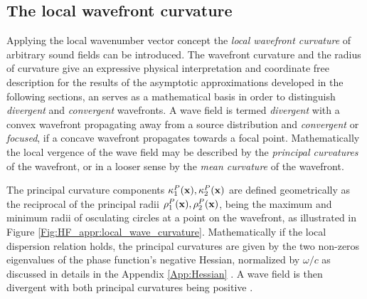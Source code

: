 \subsection{The local wavefront curvature}
%
Applying the local wavenumber vector concept the \emph{local wavefront curvature} of arbitrary sound fields can be introduced.
The wavefront curvature and the radius of curvature give an expressive physical interpretation and coordinate free description for the results of the asymptotic approximations developed in the following sections, an serves as a mathematical basis in order to distinguish \emph{divergent} and \emph{convergent} wavefronts.
A wave field is termed \emph{divergent} with a convex wavefront propagating away from a source distribution and \emph{convergent} or \emph{focused}, if a concave wavefront propagates towards a focal point.
Mathematically the local vergence of the wave field may be described by the \emph{principal curvatures} of the wavefront, or in a looser sense by the \emph{mean curvature} of the wavefront.

The principal curvature components $\kappa_1^P(\mathbf{x}),\kappa_2^P(\mathbf{x})$ are defined geometrically as the reciprocal of the principal radii $\rho_1^P(\mathbf{x}), \rho_2^P(\mathbf{x})$, being the maximum and minimum radii of osculating circles at a point on the wavefront, as illustrated in Figure \ref{Fig:HF_appr:local_wave_curvature}.
Mathematically if the local dispersion relation holds, the principal curvatures are given by the two non-zeros eigenvalues of the phase function's negative Hessian, normalized by $\omega/c$ as discussed in details in the Appendix \ref{App:Hessian} \cite{Hartmann1999, Hartmann2001}.
A wave field is then divergent with both principal curvatures being positive \cite{Arnold1986, Bleistein1984, HF_and_Pulse_Scattering1992}.

